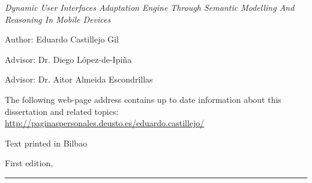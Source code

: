 
\thispagestyle{empty}

\hfill

\vfill

\medskip


\noindent
\textit{
Dynamic User Interfaces Adaptation Engine Through Semantic Modelling And
Reasoning In Mobile Devices
}




Author: Eduardo Castillejo Gil

Advisor: Dr. Diego {López-de-Ipiña}

Advisor: Dr. Aitor Almeida Escondrillas



\vfill

\vfill

\noindent
The following web-page address contains up to date information about this 
dissertation and related topics: \\
\url{http://paginaspersonales.deusto.es/eduardo.castillejo/}


\noindent
Text printed in Bilbao

\noindent
First edition, 
\monthname \ \the\year

\vspace{1cm}
\hrule
\bigskip

\cleardoublepage

%
%
%
%
%
%

